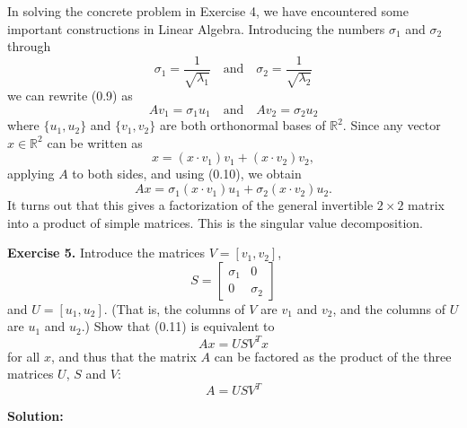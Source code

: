 \documentclass[12pt]{article}
\begin{document}
In solving the concrete problem in Exercise 4, we have encountered some important constructions in Linear Algebra. Introducing the numbers $\sigma_{1}$ and $\sigma_{2}$ through
\[
    \sigma_{1}=\frac{1}{\sqrt{\lambda_{1}}} \quad \text{and} \quad \sigma_{2}=\frac{1}{\sqrt{\lambda_{2}}}
\]
we can rewrite (0.9) as
\begin{equation}
    Av_{1}=\sigma_{1}u_{1} \quad \text{and} \quad Av_{2}=\sigma_{2}u_{2} \tag{0.10}
\end{equation}
where $\{u_{1},u_{2}\}$ and $\{v_{1},v_{2}\}$ are both orthonormal bases of $\mathbb{R}^{2}$. Since any vector $x\in\mathbb{R}^{2}$ can be written as
\[
    x=(x\cdot v_{1})v_{1}+(x\cdot v_{2})v_{2},
\]
applying $A$ to both sides, and using (0.10), we obtain
\begin{equation}
    Ax=\sigma_{1}(x\cdot v_{1})u_{1}+\sigma_{2}(x\cdot v_{2})u_{2}. \tag{0.11}
\end{equation}
It turns out that this gives a factorization of the general invertible $2\times2$ matrix into a product of simple matrices. This is the singular value decomposition.

\bigskip
\noindent \textbf{Exercise 5.} Introduce the matrices $V=[v_{1},v_{2}]$,
\[
    S=\begin{bmatrix}\sigma_{1}&0\\ 0&\sigma_{2}\end{bmatrix}
\]
and $U=[u_{1},u_{2}]$. (That is, the columns of $V$ are $v_{1}$ and $v_{2}$, and the columns of $U$ are $u_{1}$ and $u_{2}$.) Show that (0.11) is equivalent to
\[
    Ax=USV^{T}x
\]
for all $x$, and thus that the matrix $A$ can be factored as the product of the three matrices $U$, $S$ and $V$:
\[
    A=USV^{T}
\]

\textbf{Solution:}
\end{document}
